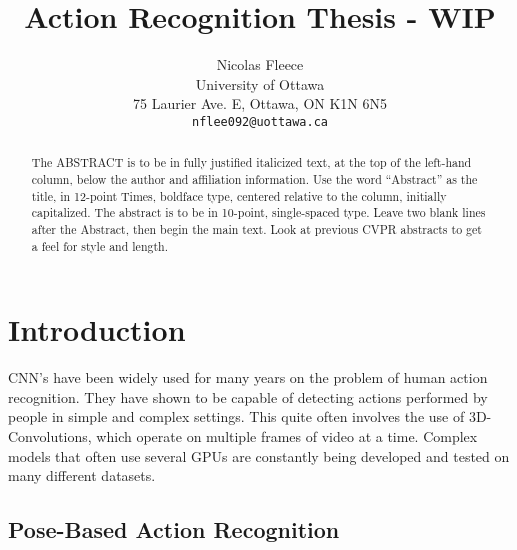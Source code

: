 \documentclass[10pt,twocolumn,letterpaper]{article}
\begin{document}
\title{Action Recognition Thesis - WIP}

\author{Nicolas Fleece\\
University of Ottawa\\
75 Laurier Ave. E, Ottawa, ON K1N 6N5\\
{\tt\small nflee092@uottawa.ca}
}
\maketitle

\begin{abstract}
   The ABSTRACT is to be in fully justified italicized text, at the top of the left-hand column, below the author and affiliation information.
   Use the word ``Abstract'' as the title, in 12-point Times, boldface type, centered relative to the column, initially capitalized.
   The abstract is to be in 10-point, single-spaced type.
   Leave two blank lines after the Abstract, then begin the main text.
   Look at previous CVPR abstracts to get a feel for style and length.
\end{abstract}

\section{Introduction}
\label{sec:intro}

CNN's have been widely used for many years on the problem of human action recognition. They have shown to be capable of detecting actions performed by people in simple and complex settings. This quite often involves the use of 3D-Convolutions, which operate on multiple frames of video at a time. Complex models that often use several GPUs are constantly being developed and tested on many different datasets.

\subsection{Pose-Based Action Recognition}
\end{document}
